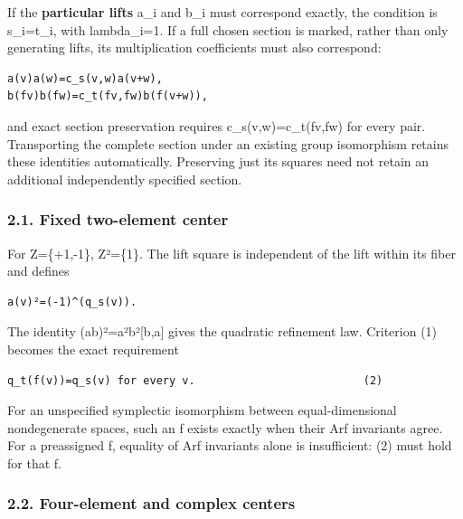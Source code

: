 If the \textbf{particular lifts} a\_i and b\_i must correspond exactly,
the condition is s\_i=t\_i, with lambda\_i=1. If a full chosen section
is marked, rather than only generating lifts, its multiplication
coefficients must also correspond:

\begin{Verbatim}[fontsize=\small,breaklines=true,breakanywhere=true]
a(v)a(w)=c_s(v,w)a(v+w),
b(fv)b(fw)=c_t(fv,fw)b(f(v+w)),
\end{Verbatim}

and exact section preservation requires c\_s(v,w)=c\_t(fv,fw) for every
pair. Transporting the complete section under an existing group
isomorphism retains these identities automatically. Preserving just its
squares need not retain an additional independently specified section.

\hypertarget{dyadic_markings-fixed-two-element-center}{%
\subsubsection{2.1. Fixed two-element
center}\label{dyadic_markings-fixed-two-element-center}}

For Z=\{+1,-1\}, Z²=\{1\}. The lift square is independent of the lift
within its fiber and defines

\begin{Verbatim}[fontsize=\small,breaklines=true,breakanywhere=true]
a(v)²=(-1)^(q_s(v)).
\end{Verbatim}

The identity (ab)²=a²b²{[}b,a{]} gives the quadratic refinement law.
Criterion (1) becomes the exact requirement

\begin{Verbatim}[fontsize=\small,breaklines=true,breakanywhere=true]
q_t(f(v))=q_s(v) for every v.                          (2)
\end{Verbatim}

For an unspecified symplectic isomorphism between equal-dimensional
nondegenerate spaces, such an f exists exactly when their Arf invariants
agree. For a preassigned f, equality of Arf invariants alone is
insufficient: (2) must hold for that f.

\hypertarget{dyadic_markings-four-element-and-complex-centers}{%
\subsubsection{2.2. Four-element and complex
centers}\label{dyadic_markings-four-element-and-complex-centers}}

